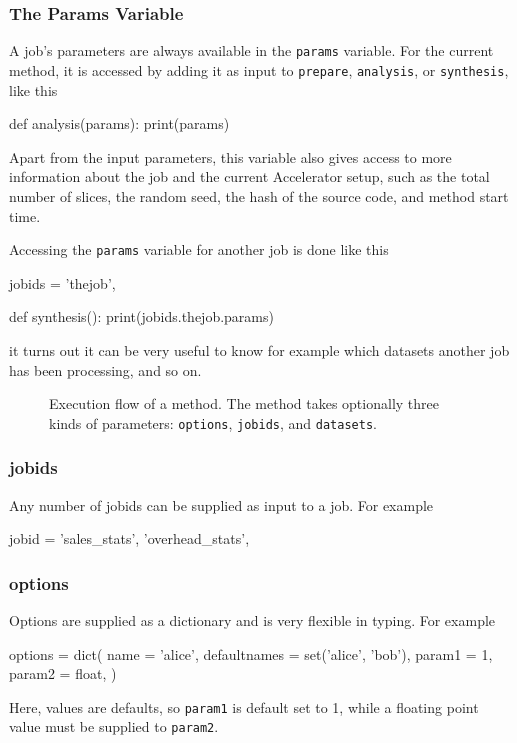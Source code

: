 \documentclass[a4paper]{article}
\begin{document}
\subsubsection{The Params Variable}
A job's parameters are always available in the \texttt{params}
variable.  For the current method, it is accessed by adding it as
input to \texttt{prepare}, \texttt{analysis}, or \texttt{synthesis}, like this
\begin{python}
  def analysis(params):
    print(params)
\end{python}
Apart from the input parameters, this variable also gives access to
more information about the job and the current Accelerator setup, such
as the total number of slices, the random seed, the hash of the source
code, and method start time.


Accessing the \texttt{params} variable for another job is done like this
\begin{python}
  jobids = {'thejob',}

  def synthesis():
    print(jobids.thejob.params)
\end{python}
it turns out it can be very useful to know for example which datasets
another job has been processing, and so on.

\begin{figure}[h!]
  \begin{center}
    
    \caption{Execution flow of a method.  The method takes optionally
      three kinds of parameters: \texttt{options}, \texttt{jobids},
      and \texttt{datasets}.}
    \label{fig:execflow}
  \end{center}
\end{figure}


\subsubsection{jobids}
Any number of jobids can be supplied as input to a job.  For example
\begin{python}
  jobid = {'sales_stats', 'overhead_stats',}
\end{python}

\subsubsection{options}
Options are supplied as a dictionary and is very flexible in typing.  For example
\begin{python}
  options = dict(
    name = 'alice',
    defaultnames = set('alice', 'bob'),
    param1 = 1,
    param2 = float,
  )
\end{python}
Here, values are defaults, so \texttt{param1} is default set to 1,
while a floating point value must be supplied to \texttt{param2}.
\end{document}

